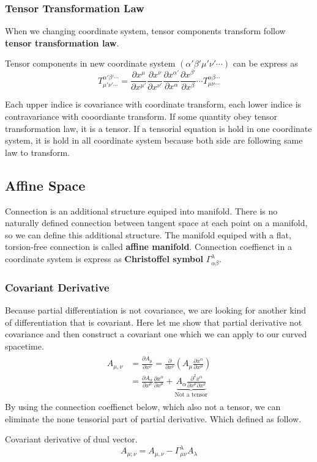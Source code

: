\documentclass[12pt]{article}
\theoremstyle{mystyle}{\newtheorem{definition}{Definition}[section]}
\theoremstyle{mystyle}{\newtheorem{theorem}[definition]{Theorem}}
\theoremstyle{mystyle}{\newtheorem*{remark}{Remark}}
\theoremstyle{mystyle}{\newtheorem*{example}{Example}}
\theoremstyle{mystyle}{\newtheorem*{examples}{Examples}}
\theoremstyle{cstyle}{\newtheorem*{cthm}{}}
\begin{document}
\subsubsection{Tensor Transformation Law}
When we changing coordinate system, tensor components transform follow \textbf{tensor transformation law}.
\begin{definition}
  Tensor components in new coordinate system \((\alpha'\beta'\mu'\nu'\cdots)\) can be express as
  \[T^{\alpha'\beta'\cdots}_{\mu'\nu'\cdots} =
    \frac{\partial x^{\mu}}{\partial x^{\mu'}}\frac{\partial x^{\nu}}{\partial x^{\nu'}}\frac{\partial x^{\alpha'}}{\partial x^{\alpha}}
    \frac{\partial x^{\beta'}}{\partial x^{\beta}} \cdots
    T^{\alpha\beta\cdots}_{\mu\nu\cdots}\]
\end{definition}
Each upper indice is covariance with coordinate transform, each lower indice is contravariance with cooordiante transform.
If some quantity obey tensor transformation law, it is a tensor. If a tensorial equation is hold in one coordinate system,
it is hold in all coordinate
system because both side are following same law to transform.

\subsection{Affine Space}
Connection is an additional structure equiped into manifold.
There is no naturally defined connection between tangent space at each point on a manifold,
so we can define this additional structure.
The manifold equiped with a flat, torsion-free connection is called \textbf{affine manifold}.
Connection coeffienct in a coordinate system is express as \textbf{Christoffel symbol} \(\Gamma^{\lambda}_{\alpha\beta}\).
\subsubsection{Covariant Derivative}
Because partial differentiation is not covariance, we are looking for another kind of differentiation that is covariant.
Here let me show that partial derivative not covariance and then construct a covariant one which we can apply to our curved spacetime.
\begin{align*}
  \begin{split}
    A_{\mu,\nu} &= \frac{\partial A_{\mu}}{\partial x^{\nu}} = \frac{\partial}{\partial x^{\nu}}
    \left( A_{\mu}\frac{\partial x^{\alpha}}{\partial x^{\mu}}\right)\\
    &= \frac{\partial A_\alpha}{\partial x^{\mu}}\frac{\partial x^{\alpha}}{\partial x^{\mu}}+
    \underbrace{A_{\alpha} \frac{\partial^2 x^{\alpha}}{\partial x^{\mu} \partial x^{\nu}}}_\text{Not a tensor}
  \end{split}
\end{align*}
By using the connection coeffienct below, which also not a tensor, we can eliminate the none tensorial part of partial derivative.
Which defined as follow.
\begin{definition}
  Covariant derivative of dual vector.
  \[A_{\mu;\nu} = A_{\mu,\nu} - \Gamma^{\lambda}_{\mu\nu}A_{\lambda}\]
\end{definition}
\end{document}
